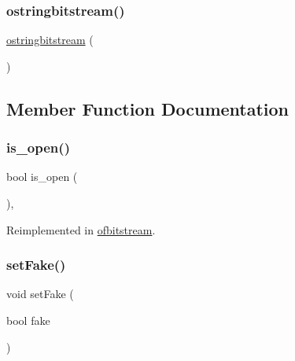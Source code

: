\subsubsection{\texorpdfstring{ostringbitstream()}{ostringbitstream()}}
{\footnotesize\ttfamily \mbox{\hyperlink{classostringbitstream}{ostringbitstream}} (\begin{DoxyParamCaption}{ }\end{DoxyParamCaption})}



\subsection{Member Function Documentation}
\mbox{\label{classobitstream_a2f57f54d8c03b615bb31eee091d8a88a}} 
\subsubsection{\texorpdfstring{is\+\_\+open()}{is\_open()}}
{\footnotesize\ttfamily bool is\+\_\+open (\begin{DoxyParamCaption}{ }\end{DoxyParamCaption})\hspace{0.3cm}{\ttfamily [virtual]}, {\ttfamily [inherited]}}



Reimplemented in \mbox{\hyperlink{classofbitstream_a2f57f54d8c03b615bb31eee091d8a88a}{ofbitstream}}.

\mbox{\label{classobitstream_ad916b4624eb09d375514964f867b475c}} 
\subsubsection{\texorpdfstring{set\+Fake()}{setFake()}}
{\footnotesize\ttfamily void set\+Fake (\begin{DoxyParamCaption}\item[{bool}]{fake }\end{DoxyParamCaption})\hspace{0.3cm}{\ttfamily [inherited]}}

\mbox{\label{classobitstream_a22727e9c338fb1aaa6722031445373c3}} 

